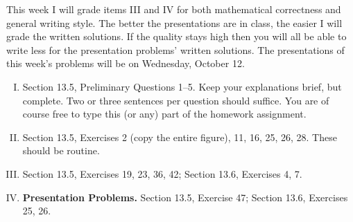 \documentclass[10pt]{amsart}
\begin{document}
    This week I will grade items III and IV for both mathematical correctness and general writing style. The better the presentations are in class, the easier I will grade the written solutions. If the quality stays high then you will all be able to write less for the presentation problems' written solutions. The presentations of this week's problems will be on Wednesday, October 12.
\begin{enumerate}[I.]
    \item Section 13.5, Preliminary Questions 1--5. Keep your explanations brief, but complete. Two or three sentences per question should suffice. You are of course free to type this (or any) part of the homework assignment.
    \item Section 13.5, Exercises 2 (copy the entire figure), 11, 16, 25, 26, 28. These should be routine.
    \item Section 13.5, Exercises 19, 23, 36, 42; Section 13.6, Exercises 4, 7.
    \item \textbf{Presentation Problems.} Section 13.5, Exercise 47; Section 13.6, Exercises 25, 26.
\end{enumerate}
\end{document}
